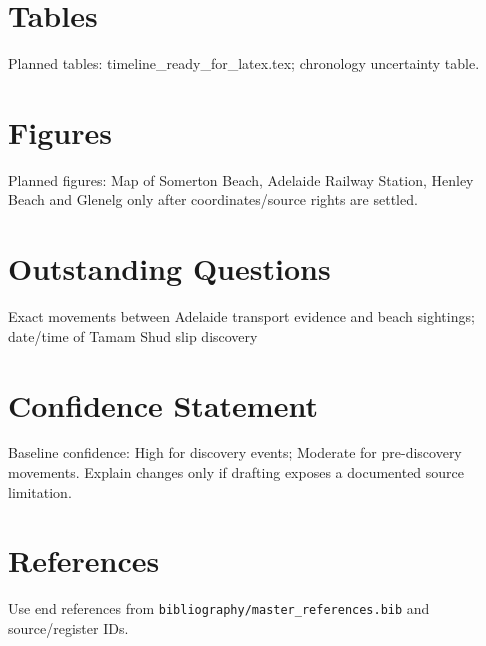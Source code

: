 \section{Tables}
Planned tables: timeline_ready_for_latex.tex; chronology uncertainty table.

\section{Figures}
Planned figures: Map of Somerton Beach, Adelaide Railway Station, Henley Beach and Glenelg only after coordinates/source rights are settled.

\section{Outstanding Questions}
Exact movements between Adelaide transport evidence and beach sightings; date/time of Tamam Shud slip discovery

\section{Confidence Statement}
Baseline confidence: High for discovery events; Moderate for pre-discovery movements. Explain changes only if drafting exposes a documented source limitation.

\section{References}
Use end references from \texttt{bibliography/master_references.bib} and source/register IDs.

